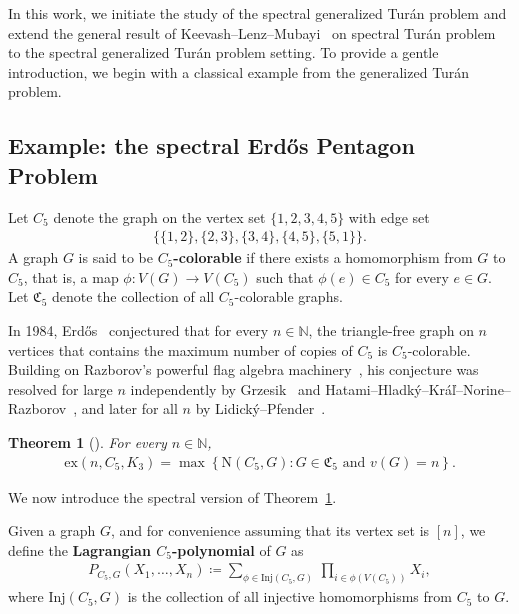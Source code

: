 \documentclass[11pt,a4paper]{article}
\newtheorem{theorem}[definition]{Theorem}
\begin{document}
In this work, we initiate the study of the spectral generalized Tur\'{a}n problem and extend the general result of Keevash--Lenz--Mubayi~\cite{KLM14} on spectral Tur\'{a}n problem to the spectral generalized Tur\'{a}n problem setting. 
To provide a gentle introduction, we begin with a classical example from the generalized Tur\'{a}n problem.


\subsection{Example: the spectral Erd\H{o}s Pentagon Problem}
%
Let $C_5$ denote the graph on the vertex set $\{1,2,3,4,5\}$ with edge set 
\begin{align*}
    \big\{\{1,2\}, \{2,3\}, \{3,4\}, \{4,5\}, \{5,1\}\big\}.
\end{align*}
%
A graph $G$ is said to be \textbf{$C_5$-colorable} if there exists a homomorphism from $G$ to $C_5$, that is, a map $\phi \colon V(G) \to V(C_5)$ such that $\phi(e) \in C_5$ for every $e \in G$. 
Let $\mathfrak{C}_{5}$ denote the collection of all $C_{5}$-colorable graphs. 

In 1984, Erd\H{o}s~\cite{Erd84} conjectured that for every $n \in \mathbb{N}$, the triangle-free graph on $n$ vertices that contains the maximum number of copies of $C_5$ is $C_5$-colorable. 
Building on Razborov’s powerful flag algebra machinery~\cite{Raz07}, his conjecture was resolved for large $n$ independently by Grzesik~\cite{Gre12} and Hatami--Hladk\'{y}--Kr\'{a}\v{l}--Norine--Razborov~\cite{HHKNR13}, and later for all $n$ by Lidick\'{y}--Pfender~\cite{LP18}.  

\begin{theorem}[\cite{Gre12,HHKNR13,LP18}]\label{THM:Pentagon-exact}
    For every $n \in \mathbb{N}$,  
    \begin{align*}
        \mathrm{ex}(n,C_5,K_{3})
        = \max\left\{\mathrm{N}(C_5, G) \colon \text{$G \in \mathfrak{C}_5$ and $v(G) = n$}\right\}.
    \end{align*}
\end{theorem}

We now introduce the spectral version of Theorem~\ref{THM:Pentagon-exact}. 

Given a graph $G$, and for convenience assuming that its vertex set is $[n]$, we define the \textbf{Lagrangian $C_5$-polynomial} of $G$ as
\begin{align*}
    P_{C_5, G}(X_1, \ldots, X_{n})
    \coloneqq \sum_{\phi \in \mathrm{Inj}(C_5, G)} \, \prod_{i\in \phi(V(C_5))} X_{i}, 
\end{align*}
where $\mathrm{Inj}(C_5, G)$ is the collection of all injective homomorphisms from $C_5$ to $G$.
\end{document}
